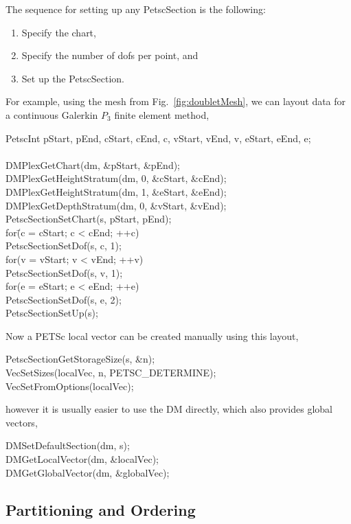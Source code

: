 {{The sequence for setting up any PetscSection is the following:
\begin{enumerate}
  \item Specify the chart,
  \item Specify the number of dofs per point, and
  \item Set up the PetscSection.
\end{enumerate}
For example, using the mesh from Fig.~\ref{fig:doubletMesh}, we can layout data for a continuous Galerkin $P_3$ finite
element method,
\begin{tabbing}
  PetscInt pStart, pEnd, cStart, cEnd, c, vStart, vEnd, v, eStart, eEnd, e;\\
\\
  DMPlexGetChart(dm, \&pStart, \&pEnd);\\
  DMPlexGetHeightStratum(dm, 0, \&cStart, \&cEnd);\\
  DMPlexGetHeightStratum(dm, 1, \&eStart, \&eEnd);\\
  DMPlexGetDepthStratum(dm, 0, \&vStart, \&vEnd);\\
  PetscSectionSetChart(s, pStart, pEnd);\\
  for\=(c = cStart; c < cEnd; ++c)\\
    \>PetscSectionSetDof(s, c, 1);\\
  for(v = vStart; v < vEnd; ++v)\\
    \>PetscSectionSetDof(s, v, 1);\\
  for(e = eStart; e < eEnd; ++e)\\
    \>PetscSectionSetDof(s, e, 2);\\
  PetscSectionSetUp(s);
\end{tabbing}
Now a PETSc local vector can be created manually using this layout,
\begin{tabbing}
  PetscSectionGetStorageSize(s, \&n);\\
  VecSetSizes(localVec, n, PETSC_DETERMINE);\\
  VecSetFromOptions(localVec);
\end{tabbing}
however it is usually easier to use the DM directly, which also provides global vectors,
\begin{tabbing}
  DMSetDefaultSection(dm, s);\\
  DMGetLocalVector(dm, \&localVec);\\
  DMGetGlobalVector(dm, \&globalVec);
\end{tabbing}

\subsection{Partitioning and Ordering}

}}
